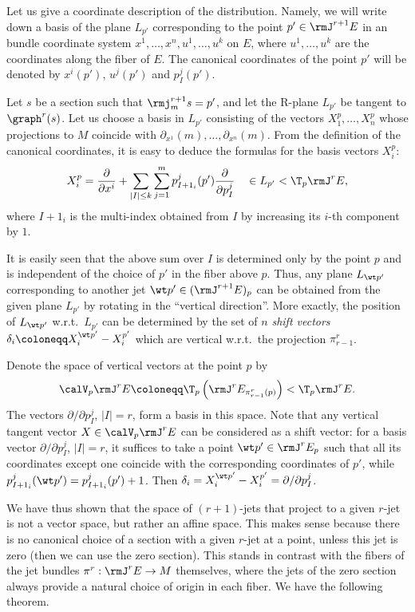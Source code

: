Let us give a coordinate description of the distribution. Namely, we will write down a basis of the plane $L_{p'}$ corresponding to the point $p'\in \rmJ^{r+1}E$ in an bundle coordinate system $x^1,\ldots,x^n,u^1,\ldots,u^k$ on $E$, where $u^1,\ldots,u^k$ are the coordinates along the fiber of $E$. The canonical coordinates of the point $p'$ will be denoted by $x^i(p')$, $u^j(p')$ and $p^j_I(p')$.

Let $s$ be a section such that $\rmj^{r+1}_m s=p'$, and let the R-plane $L_{p'}$ be tangent to $\graph^r(s)$. Let us choose a basis in $L_{p'}$ consisting of the vectors $X_1^p,\ldots,X_n^p$ whose projections to $M$ coincide with $\partial_{x^1}(m),\ldots,\partial_{x^n}(m)$. From the definition of the canonical coordinates, it is easy to deduce the formulas for the basis vectors $X^p_i$:
\[X^p_i=\frac{\partial}{\partial x^i}+\sum_{|I|\leq k}\sum_{j=1}^m p^j_{I+1_i}(p')\frac{\partial}{\partial p^j_I}\quad \in L_{p'}<\T_p \rmJ^rE,\]
where $I+1_i$ is the multi-index obtained from $I$ by increasing its $i$-th component by $1$.

It is easily seen that the above sum over $I$ is determined only by the point $p$ and is independent of the choice of $p'$ in the fiber above $p$. Thus, any plane $L_{\wt p'}$ corresponding to another jet $\wt p'\in (\rmJ^{r+1}E)_p$ can be obtained from the given plane $L_{p'}$ by rotating in the ``vertical direction''. More exactly, the position of $L_{\wt p'}$ w.r.t.\ $L_{p'}$ can be determined by the set of $n$ \emph{shift vectors} $\delta_i\coloneqq X^{\wt p'}_i-X^{p'}_i$ which are vertical w.r.t.\ the projection $\pi^r_{r-1}$.

Denote the space of vertical vectors at the point $p$ by 
\[\calV_p\rmJ^rE\coloneqq \T_p\left(\rmJ^rE_{\pi^r_{r-1}(p)}\right)<\T_p \rmJ^rE.\]
The vectors $\partial/\partial p_I^j$, $|I|=r$, form a basis in this space. Note that any vertical tangent vector $X\in \calV_p\rmJ^rE$ can be considered as a shift vector: for a basis vector $\partial/\partial p_I^j$, $|I|=r$, it suffices to take a point $\wt p'\in \rmJ^rE_p$ such that all its coordinates except one coincide with the corresponding coordinates of $p'$, while $p^j_{I+1_i}(\wt p')=p^j_{I+1_i}(p')+1$. Then $\delta_i=X_i^{\wt p'}-X_i^{p'}=\partial/\partial p^j_I$.

We have thus shown that the space of $(r+1)$-jets that project to a given $r$-jet is not a vector space, but rather an affine space. This makes sense because there is no canonical choice of a section with a given $r$-jet at a point, unless this jet is zero (then we can use the zero section). This stands in contrast with the fibers of the jet bundles $\pi^r:\rmJ^rE\to M$ themselves, where the jets of the zero section always provide a natural choice of origin in each fiber. We have the following theorem.

